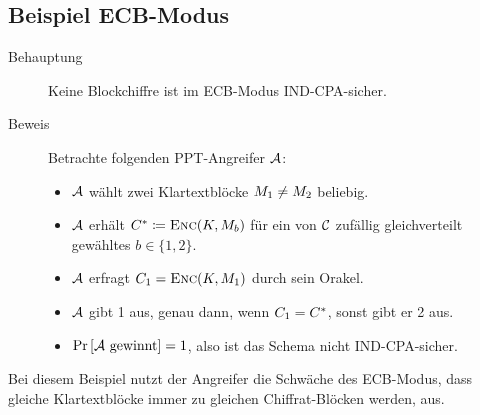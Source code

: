 \subsection{Beispiel ECB-Modus}
\begin{description}
\item[Behauptung] Keine Blockchiffre ist im ECB-Modus \indexECB
  IND-CPA-sicher.
\item[Beweis] Betrachte folgenden PPT-Angreifer $\mathcal{A}$:
  \begin{itemize}
  \item $\mathcal{A}$ wählt zwei Klartextblöcke $M_1 \neq
    M_2$ beliebig.
  \item $\mathcal{A}$ erhält $C^{*} \coloneqq \textsc{Enc}(K,
    M_{b})$ für ein von $\mathcal{C}$ zufällig gleichverteilt gewähltes $b \in
    \{1, 2\}$.
  \item $\mathcal{A}$ erfragt $C_1 = \textsc{Enc}(K, M_1)$
    durch sein Orakel.
  \item $\mathcal{A}$ gibt 1 aus, genau dann, wenn $C_1 =
    C^{*}$, sonst gibt er 2 aus.
  \item $\Pr \left[ \mathcal{A} \text{ gewinnt} \right] = 1$, also
    ist das Schema nicht IND-CPA-sicher.
  \end{itemize}
\end{description} Bei diesem Beispiel nutzt der Angreifer die Schwäche
des ECB-Modus, dass gleiche Klartextblöcke immer zu gleichen
Chiffrat-Blöcken werden, aus.

